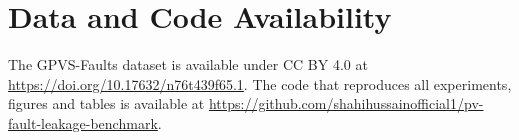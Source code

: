 \documentclass[conference]{IEEEtran}
\begin{document}
\section*{Data and Code Availability}
The GPVS-Faults dataset is available under CC BY 4.0 at \url{https://doi.org/10.17632/n76t439f65.1}. The code that reproduces all experiments, figures and tables is available at \url{https://github.com/shahihussainofficial1/pv-fault-leakage-benchmark}.


\end{document}
